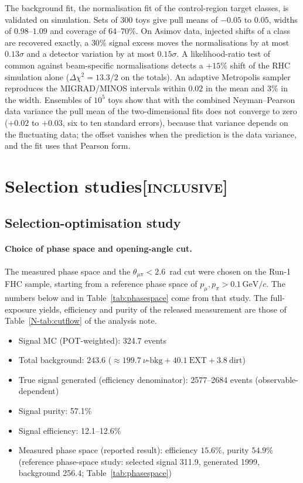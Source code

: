 \documentclass[11pt,a4paper]{article}
\newcommand{\GeVc}{\,\text{GeV}\!/c}
\newcommand{\noteref}[2]{#1~\ref{N-#2} of the analysis note}
\newcommand{\scopetag}[1]{\hfill{\normalfont\small\textsc{[#1]}}}
\begin{document}
The background fit, the normalisation fit of the control-region target classes, is validated on
simulation. Sets of $300$ toys give pull means of $-0.05$ to $0.05$, widths of $0.98$--$1.09$ and coverage of
$64$--$70\%$. On Asimov data, injected shifts of a class are recovered exactly, a $30\%$ signal excess
moves the normalisations by at most $0.13\sigma$ and a detector variation by at most $0.15\sigma$. A
likelihood-ratio test of common against beam-specific normalisations detects a $+15\%$ shift of the RHC
simulation alone ($\Delta\chi^2=13.3/2$ on the totals). An adaptive Metropolis sampler reproduces the
MIGRAD/MINOS intervals within $0.02$ in the mean and $3\%$ in the width. Ensembles of $10^5$ toys show
that with the combined Neyman--Pearson data variance the pull mean of the two-dimensional fits does not
converge to zero ($+0.02$ to $+0.03$, six to ten standard errors), because that variance depends on the
fluctuating data; the offset vanishes when the prediction is the data variance, and the fit uses that
Pearson form.



\section[Selection studies]{Selection studies\scopetag{inclusive}}
\label{sec:supp_moved}

\subsection{Selection-optimisation study}
\label{sec:supp_optim}

\paragraph{Choice of phase space and opening-angle cut.} The
measured phase space and the $\theta_{\mu\pi}<2.6$~rad cut were chosen on the Run-1 FHC
sample, starting from a reference phase space of $p_\mu,p_\pi>0.1\GeVc$. The numbers
below and in Table~\ref{tab:phasespace} come from that study. The full-exposure yields,
efficiency and purity of the released measurement are those of
\noteref{Table}{tab:cutflow}.
\begin{itemize}[noitemsep]
  \item Signal MC (POT-weighted): 324.7 events
  \item Total background: $243.6$ ($\approx199.7~\nu\text{-bkg} + 40.1~\mathrm{EXT} + 3.8~\mathrm{dirt}$)
  \item True signal generated (efficiency denominator): 2577--2684 events (observable-dependent)
  \item Signal purity: 57.1\%
  \item Signal efficiency: 12.1--12.6\%
  \item Measured phase space (reported result): efficiency $15.6\%$,
    purity $54.9\%$ (reference phase-space study: selected signal 311.9, generated
    1999, background 256.4; Table~\ref{tab:phasespace})
\end{itemize}
\end{document}
